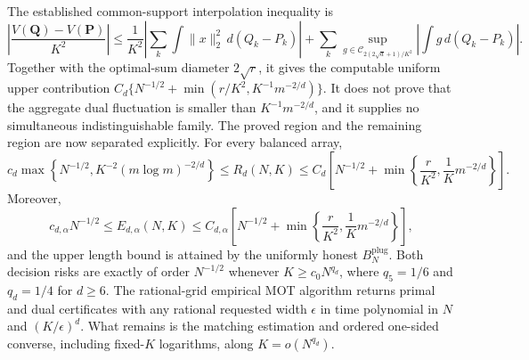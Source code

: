 The established common-support interpolation inequality is
\[
\left|\frac{V(\mathbf Q)-V(\mathbf P)}{K^2}\right|
\le \frac1{K^2}\left|\sum_k\int\|x\|_2^2\,d(Q_k-P_k)\right|
+\sum_k\sup_{g\in\mathcal C_{2(2\sqrt d+1)/K^2}}
\left|\int g\,d(Q_k-P_k)\right|.
\]
Together with the optimal-sum diameter \(2\sqrt r\), it gives the computable uniform upper contribution \(C_d\{N^{-1/2}+\min(r/K^2,K^{-1}m^{-2/d})\}\). It does not prove that the aggregate dual fluctuation is smaller than \(K^{-1}m^{-2/d}\), and it supplies no simultaneous indistinguishable family.
The proved region and the remaining region are now separated explicitly. For every balanced array,
\[
c_d\max\left\{N^{-1/2},K^{-2}(m\log m)^{-2/d}\right\}
\le R_d(N,K)
\le C_d\left[N^{-1/2}+\min\left\{\frac r{K^2},\frac1K m^{-2/d}\right\}\right].
\]
Moreover,
\[
c_{d,\alpha}N^{-1/2}
\le E_{d,\alpha}(N,K)
\le C_{d,\alpha}\left[N^{-1/2}+\min\left\{\frac r{K^2},\frac1K m^{-2/d}\right\}\right],
\]
and the upper length bound is attained by the uniformly honest \(B_N^{\mathrm{plug}}\). Both decision risks are exactly of order \(N^{-1/2}\) whenever \(K\ge c_0N^{q_d}\), where \(q_5=1/6\) and \(q_d=1/4\) for \(d\ge6\). The rational-grid empirical MOT algorithm returns primal and dual certificates with any rational requested width \(\epsilon\) in time polynomial in \(N\) and \((K/\epsilon)^d\). What remains is the matching estimation and ordered one-sided converse, including fixed-\(K\) logarithms, along \(K=o(N^{q_d})\).
